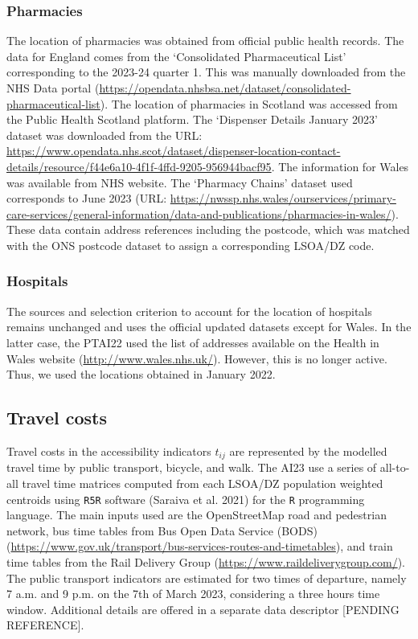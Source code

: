 \documentclass{article}
\begin{document}
\hypertarget{pharmacies}{%
\subsubsection{Pharmacies}\label{pharmacies}}

The location of pharmacies was obtained from official public health
records. The data for England comes from the `Consolidated
Pharmaceutical List' corresponding to the 2023-24 quarter 1. This was
manually downloaded from the NHS Data portal
(\url{https://opendata.nhsbsa.net/dataset/consolidated-pharmaceutical-list}).
The location of pharmacies in Scotland was accessed from the Public
Health Scotland platform. The `Dispenser Details January 2023' dataset
was downloaded from the URL:
\url{https://www.opendata.nhs.scot/dataset/dispenser-location-contact-details/resource/f44e6a10-4f1f-4ffd-9205-956944bacf95}.
The information for Wales was available from NHS website. The `Pharmacy
Chains' dataset used corresponds to June 2023 (URL:
\url{https://nwssp.nhs.wales/ourservices/primary-care-services/general-information/data-and-publications/pharmacies-in-wales/}).
These data contain address references including the postcode, which was
matched with the ONS postcode dataset to assign a corresponding LSOA/DZ
code.

\hypertarget{hospitals}{%
\subsubsection{Hospitals}\label{hospitals}}

The sources and selection criterion to account for the location of
hospitals remains unchanged and uses the official updated datasets
except for Wales. In the latter case, the PTAI22 used the list of
addresses available on the Health in Wales website
(\url{http://www.wales.nhs.uk/}). However, this is no longer active.
Thus, we used the locations obtained in January 2022.

\hypertarget{travel-costs}{%
\subsection{Travel costs}\label{travel-costs}}

Travel costs in the accessibility indicators \(t_{ij}\) are represented
by the modelled travel time by public transport, bicycle, and walk. The
AI23 use a series of all-to-all travel time matrices computed from each
LSOA/DZ population weighted centroids using \texttt{R5R} software
(Saraiva et al. 2021) for the \texttt{R} programming language. The main
inputs used are the OpenStreetMap road and pedestrian network, bus time
tables from Bus Open Data Service (BODS)
(\url{https://www.gov.uk/transport/bus-services-routes-and-timetables}),
and train time tables from the Rail Delivery Group
(\url{https://www.raildeliverygroup.com/}). The public transport
indicators are estimated for two times of departure, namely 7 a.m. and 9
p.m. on the 7th of March 2023, considering a three hours time window.
Additional details are offered in a separate data descriptor {[}PENDING
REFERENCE{]}.
\end{document}
